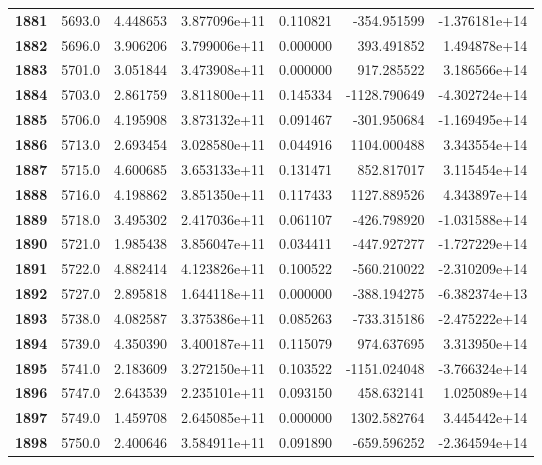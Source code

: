 \documentclass{report}[12pt]
\begin{document}
\begin{center}
\begin{tabular}{lrrrrrr}
\textbf{1881} &         5693.0 &   4.448653 &  3.877096e+11 &    0.110821 &  -354.951599 & -1.376181e+14 \\
\textbf{1882} &         5696.0 &   3.906206 &  3.799006e+11 &    0.000000 &   393.491852 &  1.494878e+14 \\
\textbf{1883} &         5701.0 &   3.051844 &  3.473908e+11 &    0.000000 &   917.285522 &  3.186566e+14 \\
\textbf{1884} &         5703.0 &   2.861759 &  3.811800e+11 &    0.145334 & -1128.790649 & -4.302724e+14 \\
\textbf{1885} &         5706.0 &   4.195908 &  3.873132e+11 &    0.091467 &  -301.950684 & -1.169495e+14 \\
\textbf{1886} &         5713.0 &   2.693454 &  3.028580e+11 &    0.044916 &  1104.000488 &  3.343554e+14 \\
\textbf{1887} &         5715.0 &   4.600685 &  3.653133e+11 &    0.131471 &   852.817017 &  3.115454e+14 \\
\textbf{1888} &         5716.0 &   4.198862 &  3.851350e+11 &    0.117433 &  1127.889526 &  4.343897e+14 \\
\textbf{1889} &         5718.0 &   3.495302 &  2.417036e+11 &    0.061107 &  -426.798920 & -1.031588e+14 \\
\textbf{1890} &         5721.0 &   1.985438 &  3.856047e+11 &    0.034411 &  -447.927277 & -1.727229e+14 \\
\textbf{1891} &         5722.0 &   4.882414 &  4.123826e+11 &    0.100522 &  -560.210022 & -2.310209e+14 \\
\textbf{1892} &         5727.0 &   2.895818 &  1.644118e+11 &    0.000000 &  -388.194275 & -6.382374e+13 \\
\textbf{1893} &         5738.0 &   4.082587 &  3.375386e+11 &    0.085263 &  -733.315186 & -2.475222e+14 \\
\textbf{1894} &         5739.0 &   4.350390 &  3.400187e+11 &    0.115079 &   974.637695 &  3.313950e+14 \\
\textbf{1895} &         5741.0 &   2.183609 &  3.272150e+11 &    0.103522 & -1151.024048 & -3.766324e+14 \\
\textbf{1896} &         5747.0 &   2.643539 &  2.235101e+11 &    0.093150 &   458.632141 &  1.025089e+14 \\
\textbf{1897} &         5749.0 &   1.459708 &  2.645085e+11 &    0.000000 &  1302.582764 &  3.445442e+14 \\
\textbf{1898} &         5750.0 &   2.400646 &  3.584911e+11 &    0.091890 &  -659.596252 & -2.364594e+14 \\

\end{tabular}
\end{center}
\end{document}
